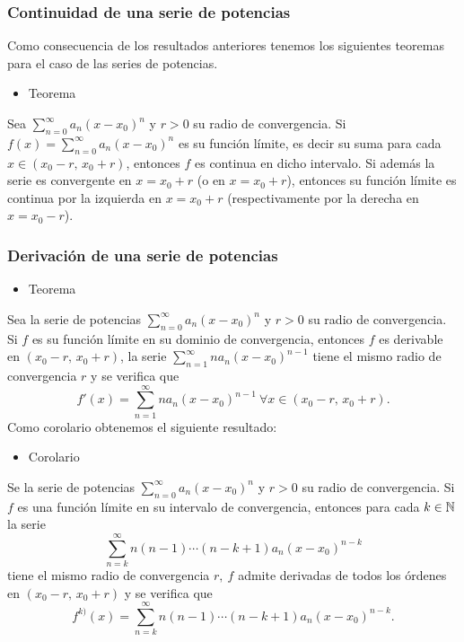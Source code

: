 \subsubsection{Continuidad de una serie de potencias}
Como consecuencia de los resultados anteriores tenemos los siguientes teoremas para el caso de las series de potencias.
\begin{itemize}[label=\color{red}\textbullet, leftmargin=*]
	\item \color{lightblue}Teorema
\end{itemize}
Sea $\sum_{n=0}^{\infty}a_n(x-x_0)^n$ y $r>0$ su radio de convergencia. Si $f(x)=\sum_{n=0}^{\infty}a_{n}(x-x_0)^n$ es su función límite, es decir su suma para cada $x\in(x_0-r,\,x_0+r)$, entonces $f$ es continua en dicho intervalo. Si además la serie es convergente en $x=x_0+r$ (o en $x=x_0+r$), entonces su función límite es continua por la izquierda en $x=x_0+r$ (respectivamente por la derecha en $x=x_0-r$).
\subsubsection{Derivación de una serie de potencias}
\begin{itemize}[label=\color{red}\textbullet, leftmargin=*]
	\item \color{lightblue}Teorema
\end{itemize}
Sea la serie de potencias $\sum_{n=0}^{\infty}a_{n}(x-x_0)^n$ y $r>0$ su radio de convergencia. Si $f$ es su función límite en su dominio de convergencia, entonces $f$ es derivable en $(x_0-r,\,x_0+r)$, la serie $\sum_{n=1}^{\infty}na_n(x-x_0)^{n-1}$ tiene el mismo radio de convergencia $r$ y se verifica que \[ f'(x)=\sum_{n=1}^{\infty}na_n(x-x_0)^{n-1}\:\forall x\in(x_0-r,\,x_0+r). \]
Como corolario obtenemos el siguiente resultado:
\begin{itemize}[label=\color{red}\textbullet, leftmargin=*]
	\item \color{lightblue}Corolario
\end{itemize}
Se la serie de potencias $\sum_{n=0}^{\infty}a_n(x-x_0)^{n}$ y $r>0$ su radio de convergencia. Si $f$ es una función límite en su intervalo de convergencia, entonces para cada $k\in\operatorname{\mathbb{N}}$ la serie \[ \sum_{n=k}^{\infty}n(n-1)\cdots(n-k+1)a_n(x-x_0)^{n-k} \]tiene el mismo radio de convergencia $r,\:f$ admite derivadas de todos los órdenes en $(x_0-r,\,x_0+r)$ y se verifica que \[ f^{k)}(x)=\sum_{n=k}^{\infty}n(n-1)\cdots(n-k+1)a_n(x-x_0)^{n-k}. \]
